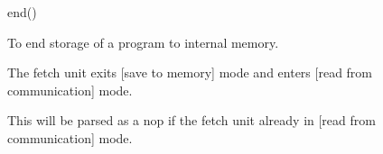 

\format
end()

\purpose

To end storage of a program to internal memory.

\description

The fetch unit exits [save to memory] mode and enters [read from communication] mode.

\notes

This will be parsed as a nop if the fetch unit already in [read from communication] mode.
